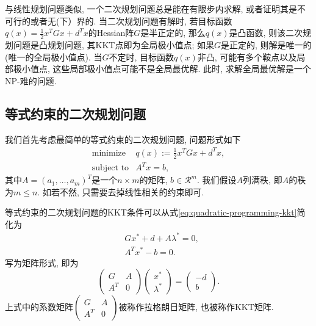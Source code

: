 \documentclass{SBCbookchapter}
\newcommand{\R}{\mathcal{R}}
\begin{document}
与线性规划问题类似, 一个二次规划问题总是能在有限步内求解, 或者证明其是不可行的或者无(下）界的. 当二次规划问题有解时, 若目标函数$q(x) = \frac{1}{2} x^T G x + d^T x$的Hessian阵$G$是半正定的, 那么$q(x)$是凸函数, 则该二次规划问题是凸规划问题, 其KKT点即为全局极小值点; 如果$G$是正定的, 则解是唯一的(唯一的全局极小值点). 当$G$不定时, 目标函数$q(x)$非凸, 可能有多个鞍点以及局部极小值点, 这些局部极小值点可能不是全局最优解. 此时, 求解全局最优解是一个NP-难的问题\cite{Murty_1987}.


\subsection{等式约束的二次规划问题}
\label{subsec:7.2.1}

我们首先考虑最简单的等式约束的二次规划问题, 问题形式如下
\begin{equation}
\label{eq:quadratic-programming-eq-constrained}
\begin{array}{cl}
\text{minimize} & q(x) := \frac{1}{2} x^T G x + d^T x, \\
\text{subject to} & A^T x = b,
\end{array}
\end{equation}
其中$A = (a_1, \ldots, a_m)^T$是一个$n \times m$的矩阵, $b\in \R^m.$ 我们假设$A$列满秩, 即$A$的秩为$m \leqslant n.$ 如若不然, 只需要去掉线性相关的约束即可.

等式约束的二次规划问题的KKT条件可以从式\eqref{eq:quadratic-programming-kkt}简化为
\begin{equation}
\label{eq:quadratic-programming-kkt-2}
\begin{aligned}
& G x^* + d + A \lambda^* = 0, \\
& A^T x^* - b = 0.
\end{aligned}
\end{equation}
写为矩阵形式, 即为
\begin{equation}
\label{eq:quadratic-programming-kkt-2-mat}
\begin{pmatrix} G & A \\ A^T & 0 \end{pmatrix} \begin{pmatrix} x^* \\ \lambda^* \end{pmatrix} = \begin{pmatrix} -d \\ b \end{pmatrix}.
\end{equation}
上式中的系数矩阵$\begin{pmatrix} G & A \\ A^T & 0 \end{pmatrix}$被称作拉格朗日矩阵, 也被称作KKT矩阵.
\end{document}
